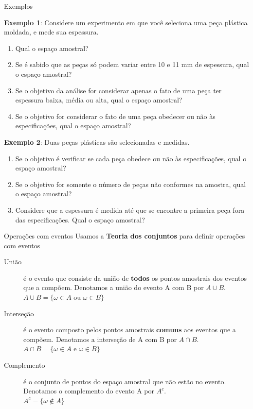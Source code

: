 \documentclass[10pt]{beamer}\usepackage[]{graphicx}\usepackage[]{color}
\theoremstyle{definition}
\begin{document}
\begin{frame}{Exemplos}
\begin{small}
  \textbf{Exemplo 1}: Considere um experimento em que você seleciona
  uma peça plástica moldada, e mede sua espessura.
  \begin{enumerate}
  \item Qual o espaço amostral?
  \item Se é sabido que as peças só podem variar entre 10 e 11 mm de
    espessura, qual o espaço amostral?
  \item Se o objetivo da análise for considerar apenas o fato de uma
    peça ter espessura baixa, média ou alta, qual o espaço amostral?
  \item Se o objetivo for considerar o fato de uma peça obedecer ou não
    às especificações, qual o espaço amostral?
  \end{enumerate}
  \textbf{Exemplo 2}: Duas peças plásticas são selecionadas e medidas.
  \begin{enumerate}
  \item Se o objetivo é verificar se cada peça obedece ou não às
    especificações, qual o espaço amostral?
  \item Se o objetivo for somente o número de peças não conformes na
    amostra, qual o espaço amostral?
  \item Considere que a espessura é medida até que se encontre a
    primeira peça fora das especificações. Qual o espaço amostral?
  \end{enumerate}
\end{small}
\end{frame}

\begin{frame}{Operações com eventos}
  Usamos a \textbf{Teoria dos conjuntos} para definir operações com
  eventos
  \begin{block}{}
\begin{description}
 \item[União] é o evento que consiste da união de \textbf{todos} os pontos
   amostrais dos eventos que a compõem. Denotamos a união do evento A
   com B por $A\cup B$.\\
   $A \cup B = \{\omega \in A \text{ ou } \omega \in B\}$
 \item[Interseção] é o evento composto pelos pontos amostrais
   \textbf{comuns} aos eventos que a compõem. Denotamos a interseção de
   A com B por $A\cap B$.\\
   $A \cap B = \{\omega \in A \text{ e } \omega \in B\}$
 \item[Complemento] é o conjunto de pontos do espaço amostral que não
   estão no evento. Denotamos o complemento do evento A por $A^c$.\\
   $A^c = \{\omega \not\in A \}$
\end{description}
\end{block}
\end{frame}
\end{document}
